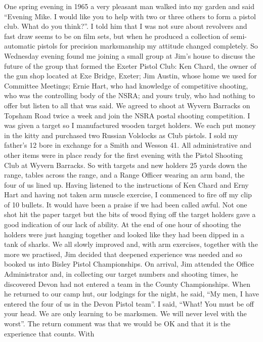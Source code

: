 One spring evening in 1965 a very pleasant man walked into my garden and said
``Evening Mike. I would like you to help with two or three others to form a
pistol club. What do you think?''. I told him that I was not sure about
revolvers and fast draw seems to be on film sets, but when he produced a
collection of semi-automatic pistols for precision marksmanship my attitude
changed completely. So Wednesday evening found me joining a small group at
Jim's house to discuss the future of the group that formed the Exeter Pistol
Club: Ken Chard, the owner of the gun shop located at Exe Bridge, Exeter; Jim
Austin, whose home we used for Committee Meetings; Ernie Hart, who had
knowledge of competitive shooting, who was the controlling body of the NSRA;
and yours truly, who had nothing to offer but listen to all that was said. We
agreed to shoot at Wyvern Barracks on Topsham Road twice a week and join the
NSRA postal shooting competition. I was given a target so I manufactured wooden
target holders. We each put money in the kitty and purchased two Russian
Volslocks as Club pistols. I sold my father's 12 bore in exchange for a Smith
and Wesson 41. All administrative and other items were in place ready for the
first evening with the Pistol Shooting Club at Wyvern Barracks. So with targets
and new holders 25 yards down the range, tables across the range, and a Range
Officer wearing an arm band, the four of us lined up. Having listened to the
instructions of Ken Chard and Erny Hart and having not taken arm muscle
exercise, I commenced to fire off my clip of 10 bullets. It would have been a
praise if we had been called awful. Not one shot hit the paper target but the
bits of wood flying off the target holders gave a good indication of our lack
of ability. At the end of one hour of shooting the holders were just hanging
together and looked like they had been dipped in a tank of sharks. We all
slowly improved and, with arm exercises, together with the more we practised,
Jim decided that deepened experience was needed and so booked us into Bisley
Pistol Championships. On arrival, Jim attended the Office Administrator and, in
collecting our target numbers and shooting times, he discovered Devon had not
entered a team in the County Championships. When he returned to our camp hut,
our lodgings for the night, he said, ``My men, I have entered the four of us in
the Devon Pistol team''. I said, ``What! You must be off your head. We are only
learning to be marksmen. We will never level with the worst''. The return
comment was that we would be OK and that it is the experience that counts. With
